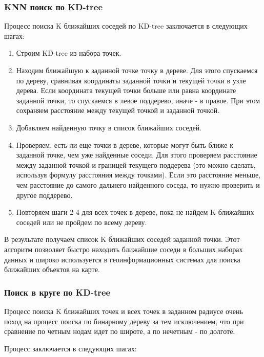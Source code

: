 \subsubsection{KNN поиск по KD-tree}

Процесс поиска K ближайших соседей по KD-tree заключается в следующих шагах:

\begin{enumerate}
    \item Строим KD-tree из набора точек.
    \item Находим ближайшую к заданной точке точку в дереве. Для этого спускаемся по дереву, сравнивая координаты заданной точки и текущей точки в узле дерева. Если координата текущей точки больше или равна координате заданной точки, то спускаемся в левое поддерево, иначе - в правое. При этом сохраняем расстояние между текущей точкой и заданной точкой.
    \item Добавляем найденную точку в список ближайших соседей.
    \item Проверяем, есть ли еще точки в дереве, которые могут быть ближе к заданной точке, чем уже найденные соседи. Для этого проверяем расстояние между заданной точкой и границей текущего поддерева (это можно сделать, используя формулу расстояния между точками). Если это расстояние меньше, чем расстояние до самого дальнего найденного соседа, то нужно проверить и другое поддерево.
    \item Повторяем шаги 2-4 для всех точек в дереве, пока не найдем K ближайших соседей или не пройдем по всему дереву.
\end{enumerate}

В результате получаем список K ближайших соседей заданной точки. Этот алгоритм позволяет быстро находить ближайшие соседи в больших наборах данных и широко используется в геоинформационных системах для поиска ближайших объектов на карте.

\subsubsection{Поиск в круге по KD-tree}
Процесс поиска K ближайших точек и всех точек в заданном радиусе очень поход на процесс поиска по бинарному дереву за тем исключением, что при сравнение по четным нодам идет по широте, а по нечетным - по долготе.

Процесс заключается в следующих шагах:

